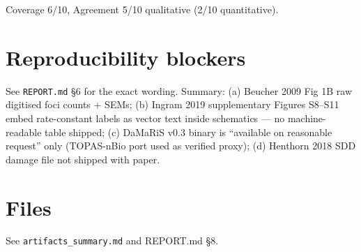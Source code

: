 \documentclass[11pt]{article}
\begin{document}
Coverage 6/10, Agreement 5/10 qualitative (2/10 quantitative).

\section{Reproducibility blockers}
See \texttt{REPORT.md} \S6 for the exact wording. Summary:
(a) Beucher 2009 Fig 1B raw digitised foci counts + SEMs;
(b) Ingram 2019 supplementary Figures S8--S11 embed rate-constant
labels as vector text inside schematics --- no machine-readable
table shipped;
(c) DaMaRiS v0.3 binary is ``available on reasonable request'' only
(TOPAS-nBio port used as verified proxy);
(d) Henthorn 2018 SDD damage file not shipped with paper.

\section{Files}
See \texttt{artifacts\_summary.md} and REPORT.md \S8.
\end{document}

